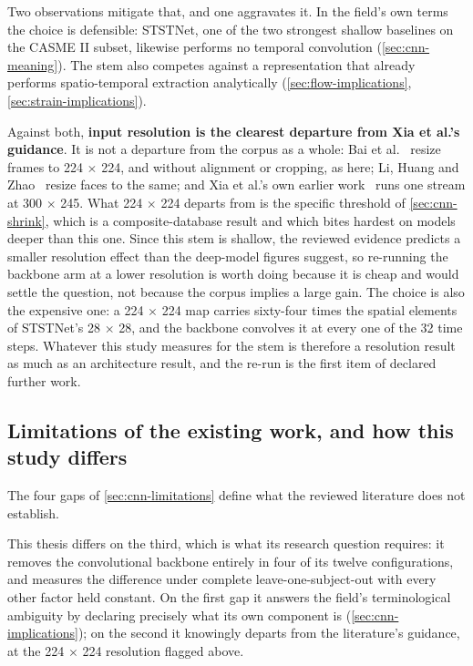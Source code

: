 Two observations mitigate that, and one aggravates it. In the field's own terms the choice is defensible: STSTNet, one of the two strongest shallow baselines on the CASME II subset, likewise performs no temporal convolution (\autoref{sec:cnn-meaning}). The stem also competes against a representation that already performs spatio-temporal extraction analytically (\autoref{sec:flow-implications}, \autoref{sec:strain-implications}).

Against both, \textbf{input resolution is the clearest departure from Xia et al.'s guidance}. It is not a departure from the corpus as a whole: Bai et al.~\cite{bai2021} resize frames to 224 $\times$ 224, and without alignment or cropping, as here; Li, Huang and Zhao~\cite{liY2021} resize faces to the same; and Xia et al.'s own earlier work~\cite{xia2020a} runs one stream at 300 $\times$ 245. What 224 $\times$ 224 departs from is the specific threshold of \autoref{sec:cnn-shrink}, which is a composite-database result and which bites hardest on models deeper than this one. Since this stem is shallow, the reviewed evidence predicts a smaller resolution effect than the deep-model figures suggest, so re-running the backbone arm at a lower resolution is worth doing because it is cheap and would settle the question, not because the corpus implies a large gain. The choice is also the expensive one: a 224 $\times$ 224 map carries sixty-four times the spatial elements of STSTNet's 28 $\times$ 28, and the backbone convolves it at every one of the 32 time steps. Whatever this study measures for the stem is therefore a resolution result as much as an architecture result, and the re-run is the first item of declared further work.

\subsection{Limitations of the existing work, and how this study differs}
\label{sec:cnn-gap}

The four gaps of \autoref{sec:cnn-limitations} define what the reviewed literature does not establish.

This thesis differs on the third, which is what its research question requires: it removes the convolutional backbone entirely in four of its twelve configurations, and measures the difference under complete leave-one-subject-out with every other factor held constant. On the first gap it answers the field's terminological ambiguity by declaring precisely what its own component is (\autoref{sec:cnn-implications}); on the second it knowingly departs from the literature's guidance, at the 224 $\times$ 224 resolution flagged above.


